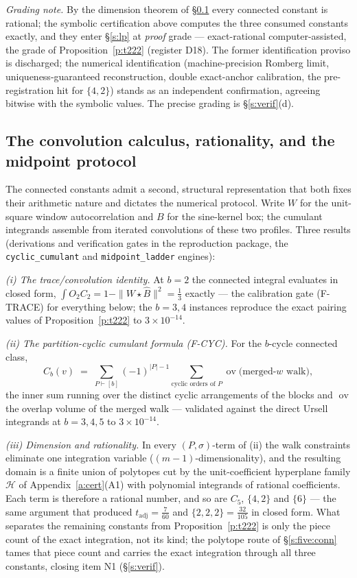 \documentclass[11pt]{article}
\numberwithin{equation}{section}
\theoremstyle{definition}
\theoremstyle{remark}
\begin{document}
\emph{Grading note.} By the dimension theorem of
\S\ref{s:conv} every connected constant is rational; the
symbolic certification above computes the three consumed
constants exactly, and they enter \S\ref{s:lp} at \emph{proof}
grade --- exact-rational computer-assisted, the grade of
Proposition~\ref{p:t222} (register D18). The former
identification proviso is discharged; the numerical
identification (machine-precision Romberg limit,
uniqueness-guaranteed reconstruction, double exact-anchor
calibration, the pre-registration hit for $\{4,2\}$) stands as
an independent confirmation, agreeing bitwise with the
symbolic values. The precise grading is \S\ref{s:verif}(d).

\subsection{The convolution calculus, rationality, and the
midpoint protocol}\label{s:conv}

The connected constants admit a second, structural
representation that both fixes their arithmetic nature and
dictates the numerical protocol. Write $W$ for the unit-square
window autocorrelation and $B$ for the sine-kernel box; the
cumulant integrands assemble from iterated convolutions of these
two profiles. Three results (derivations and verification gates
in the reproduction package, the \texttt{cyclic\_cumulant} and
\texttt{midpoint\_ladder} engines):

\emph{(i) The trace/convolution identity.} At $b=2$ the
connected integral evaluates in closed form,
$\int O_2C_2=1-\|W\star\widehat B\|^{2}=\tfrac13$ exactly ---
the calibration gate (F-TRACE) for everything below; the $b=3,4$
instances reproduce the exact pairing values of
Proposition~\ref{p:t222} to $3\times10^{-14}$.

\emph{(ii) The partition-cyclic cumulant formula (F-CYC).} For
the $b$-cycle connected class,
\[
C_b(v)\;=\;\sum_{P\vdash[b]}(-1)^{|P|-1}
\sum_{\text{cyclic orders of }P}
\operatorname{ov}\bigl(\text{merged-}w\text{ walk}\bigr),
\]
the inner sum running over the distinct cyclic arrangements of
the blocks and $\operatorname{ov}$ the overlap volume of the
merged walk --- validated against the direct Ursell integrands
at $b=3,4,5$ to $3\times10^{-14}$.

\emph{(iii) Dimension and rationality.} In every
$(P,\sigma)$-term of (ii) the walk constraints eliminate one
integration variable ($(m-1)$-dimensionality), and the resulting
domain is a finite union of polytopes cut by the unit-coefficient
hyperplane family $\mathcal H$ of Appendix~\ref{a:cert}(A1)
with polynomial integrands of rational coefficients. Each term
is therefore a rational number, and so are $C_5$, $\{4,2\}$ and
$\{6\}$ --- the same argument that produced
$t_{\mathrm{adj}}=\tfrac7{60}$ and $\{2,2,2\}=\tfrac{32}{105}$
in closed form. What separates the remaining constants from
Proposition~\ref{p:t222} is only the piece count of the exact
integration, not its kind; the polytope route of
\S\ref{s:five:conn} tames that piece count and carries the
exact integration through all three constants, closing item
N1 (\S\ref{s:verif}).
\end{document}
